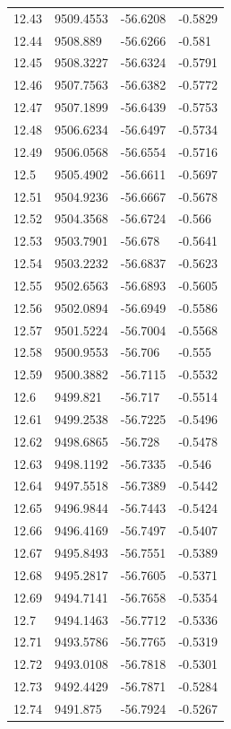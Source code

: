 \begin{table}[H]
\begin{tabular}{llll}
12.43 & 9509.4553 & -56.6208 & -0.5829 \\
12.44 & 9508.889 & -56.6266 & -0.581 \\
12.45 & 9508.3227 & -56.6324 & -0.5791 \\
12.46 & 9507.7563 & -56.6382 & -0.5772 \\
12.47 & 9507.1899 & -56.6439 & -0.5753 \\
12.48 & 9506.6234 & -56.6497 & -0.5734 \\
12.49 & 9506.0568 & -56.6554 & -0.5716 \\
12.5 & 9505.4902 & -56.6611 & -0.5697 \\
12.51 & 9504.9236 & -56.6667 & -0.5678 \\
12.52 & 9504.3568 & -56.6724 & -0.566 \\
12.53 & 9503.7901 & -56.678 & -0.5641 \\
12.54 & 9503.2232 & -56.6837 & -0.5623 \\
12.55 & 9502.6563 & -56.6893 & -0.5605 \\
12.56 & 9502.0894 & -56.6949 & -0.5586 \\
12.57 & 9501.5224 & -56.7004 & -0.5568 \\
12.58 & 9500.9553 & -56.706 & -0.555 \\
12.59 & 9500.3882 & -56.7115 & -0.5532 \\
12.6 & 9499.821 & -56.717 & -0.5514 \\
12.61 & 9499.2538 & -56.7225 & -0.5496 \\
12.62 & 9498.6865 & -56.728 & -0.5478 \\
12.63 & 9498.1192 & -56.7335 & -0.546 \\
12.64 & 9497.5518 & -56.7389 & -0.5442 \\
12.65 & 9496.9844 & -56.7443 & -0.5424 \\
12.66 & 9496.4169 & -56.7497 & -0.5407 \\
12.67 & 9495.8493 & -56.7551 & -0.5389 \\
12.68 & 9495.2817 & -56.7605 & -0.5371 \\
12.69 & 9494.7141 & -56.7658 & -0.5354 \\
12.7 & 9494.1463 & -56.7712 & -0.5336 \\
12.71 & 9493.5786 & -56.7765 & -0.5319 \\
12.72 & 9493.0108 & -56.7818 & -0.5301 \\
12.73 & 9492.4429 & -56.7871 & -0.5284 \\
12.74 & 9491.875 & -56.7924 & -0.5267 \\

\end{tabular}
\end{table}
